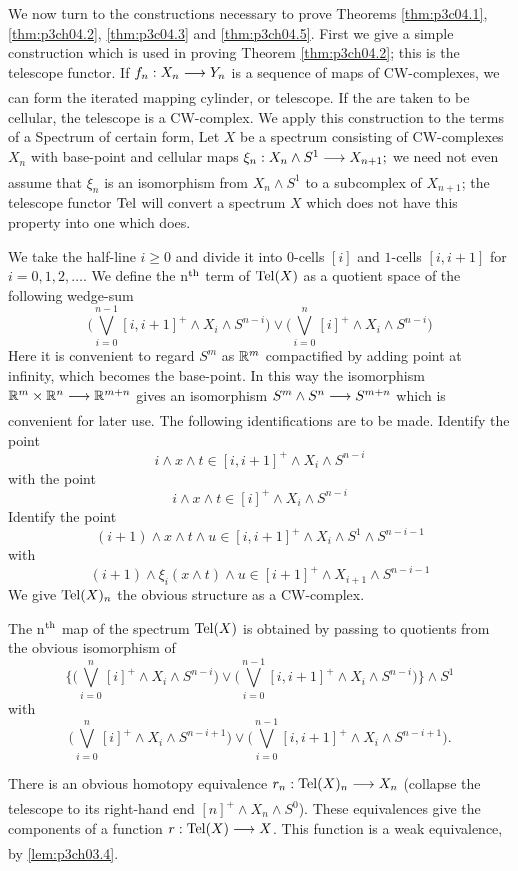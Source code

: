 \documentclass[../main]{subfiles}
\begin{document}
We now turn to the constructions necessary to prove Theorems \ref{thm:p3c04.1},
\ref{thm:p3ch04.2}, \ref{thm:p3c04.3} and \ref{thm:p3ch04.5}. First we give a simple construction which is used in
proving Theorem \ref{thm:p3ch04.2}; this is the telescope functor. If $f_n:X_n\lar{}Y_n$
is a sequence of maps of CW-complexes, we can form the iterated
mapping cylinder, or telescope. If the are taken to be cellular, the
telescope is a CW-complex. We apply this construction to the terms of
a Spectrum of certain form, Let $X$ be a spectrum consisting of CW-complexes $X_n$ with base-point and cellular maps $\xi_n:X_n\wedge S^1\lar{}X_{n+1} ;$
 we need not even assume that $\xi_n$ is an isomorphism from $X_n\wedge S^1$ to a
subcomplex of $X_{n+1}$; the telescope functor $\mathrm{Tel}$  will convert a spectrum
$X$ which does not have this property into one which does. 

We take the half-line $i\geq 0$ and divide it into $0$-cells $[i]$ and $1$-cells $[i,i+1]$ for $i=0,1,2,\dots$. We define the n$^{\text{th}}$ term of $\mathrm{Tel}(X)$ as a quotient space of the following wedge-sum
\[\bigg(\bigvee_{i=0}^{n-1} [i,i+1]^+\wedge X_i\wedge S^{n-i} \bigg)\vee \bigg(\bigvee_{i=0}^n [i]^+\wedge X_i\wedge S^{n-i}\bigg) \]
Here it is convenient to regard $S^m$ as $\mathbb{R}^m$ compactified by adding point at infinity, which becomes the base-point. In this way the isomorphism $\bR^m\times \bR^n \lar{} \bR^{m+n}$ gives an isomorphism $S^m\wedge S^n \lar{} S^{m+n}$ which is convenient for later use. The following identifications are to
be made. Identify the point 
\[i\wedge x\wedge t\in [i,i+1]^+ \wedge X_i \wedge S^{n-i} \]
with the point \[i\wedge x\wedge t \in [i]^+\wedge X_i\wedge S^{n-i} \]
Identify the point \[(i+1)\wedge x\wedge t\wedge u\in [i,i+1]^+\wedge X_i\wedge S^1\wedge S^{n-i-1}\]
with
\[(i+1)\wedge \xi_i(x\wedge t)\wedge u\in [i+1]^+\wedge X_{i+1}\wedge S^{n-i-1}\]
We give $\mathrm{Tel}(X)_n$ the obvious structure as a CW-complex.

The n$^{\text{th}}$ map of the spectrum $\mathrm{Tel}(X)$ is obtained by passing to quotients from the obvious isomorphism of \[\bigg\{\bigg(\bigvee_{i=0}^n [i]^+\wedge X_i\wedge S^{n-i}\bigg)\vee \bigg(\bigvee_{i=0}^{n-1} [i,i+1]^+\wedge X_i\wedge S^{n-i} \bigg) \bigg\}\wedge S^1 \]
with 
\[\bigg(\bigvee_{i=0}^n [i]^+\wedge X_i\wedge S^{n-i+1}\bigg)\vee \bigg(\bigvee_{i=0}^{n-1} [i,i+1]^+\wedge X_i\wedge S^{n-i+1} \bigg).\]

There is an obvious homotopy equivalence $r_n:\te{Tel}(X)_n\lar{}X_n$ (collapse the telescope to its right-hand end $[n]^+\wedge X_n\wedge S^0$). These equivalences give the components of a function $r:\te{Tel}(X)\lar{}X$. This function is a weak equivalence, by \ref{lem:p3ch03.4}.
\end{document}
